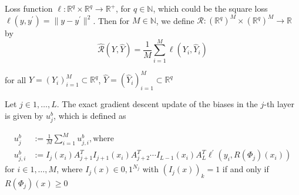 \documentclass[draft]{article}
\def\RealSet{\mathbb{R}}
\begin{document}
Loss function $\ell \colon \RealSet^q \times  \RealSet^q \rightarrow  \RealSet^{+}$, for $q \in \mathbb{N}$, which could be the square loss $\ell(y,y^\prime)=\| y - y^\prime \|^2$. Then for $M \in \mathbb{N}$, we define $\mathcal{R} \colon (\RealSet^q)^M \times (\RealSet^q)^M \rightarrow \RealSet$ by
\[
\hat{\mathcal{R}} (Y,\hat Y) = \frac1{M} \sum_{i=1}^M \ell(Y_i, \hat Y_i)
\]

for all $Y=(Y_i)_{i=1}^M \subset \RealSet^q$, $\hat Y = (\hat Y_i)_{i=1}^M \subset \RealSet^q$

Let $j \in {1,\ldots,L}$. The exact gradient descent update of the biases in the $j$-th layer is given by $u_j^b$, which is defined as

\begin{align}
u_j^b &:= \frac1{M} \sum_{i=1}^M u_{j,i}^b, \text{where} \\
u_{j,i}^b &:= I_j(x_i)A_{j+1}^T I_{j+1}(x_i) A_{j+2}^T \cdots I_{L-1}(x_i)A_L^T \ell^\prime(y_i, R(\Phi_j)(x_i))
\end{align}
for $i\in {1,\ldots,M}$, where $I_j(x)\in{0,1}^{N_j}$ with $(I_j(x))_k = 1$ if and only if $R(\Phi_j)(x)\geqslant0$






\end{document}
